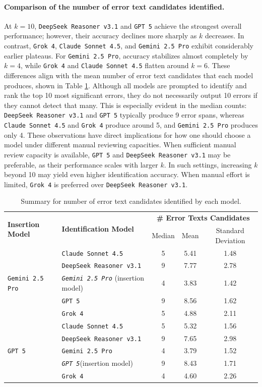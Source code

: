 \documentclass{article}
\newcommand{\gemini}{\texttt{Gemini 2.5 Pro}}
\newcommand{\gpt}{\texttt{GPT 5}}
\newcommand{\grok}{\texttt{Grok 4}}
\newcommand{\deepseek}{\texttt{DeepSeek Reasoner v3.1}}
\newcommand{\claude}{\texttt{Claude Sonnet 4.5}}
\begin{document}
\paragraph{Comparison of the number of error text candidates identified.} At $k=10$, \deepseek{} and \gpt{} achieve the strongest overall performance; however, their accuracy declines more sharply as $k$ decreases. In contrast, \grok{}, \claude{}, and \gemini{} exhibit considerably earlier plateaus. For \gemini{}, accuracy stabilizes almost completely by $k = 4$, while \grok{} and \claude{} flatten around $k = 6$. These differences align with the mean number of error text candidates that each model produces, shown in Table \ref{table:mean_num_identification}. Although all models are prompted to identify and rank the top 10 most significant errors, they do not necessarily output 10 errors if they cannot detect that many. This is especially evident in the median counts: \deepseek{} and \gpt{} typically produce 9 error spans, whereas \claude{} and \grok{} produce around 5, and \gemini{} produces only 4. These observations have direct implications for how one should choose a model under different manual reviewing capacities. When sufficient manual review capacity is available, \gpt{} and \deepseek{} may be preferable, as their performance scales with larger $k$. In such settings, increasing $k$ beyond 10 may yield even higher identification accuracy. When manual effort is limited, \grok{} is preferred over \deepseek{}. 

\begin{table}[!t]
\centering
\begin{tabular}{llccc}
\hline
\multirow{2}{*}{\textbf{Insertion Model}} & \multirow{2}{*}{\textbf{Identification Model}} & \multicolumn{3}{c}{\textbf{\# Error Texts Candidates}} \\
& & Median & Mean & Standard Deviation \\
\hline
\multirow{5}{*}{\gemini{}} & \claude{} & 5 & 5.41 & 1.48\\
& \deepseek{} & 9 & 7.77 & 2.78 \\
& \textit{\gemini{}} (insertion model) & 4 & 3.83 & 1.42\\
& \gpt{} & 9 & 8.56 & 1.62\\
& \grok{} & 5 & 4.88 & 2.11\\
\hline
\multirow{5}{*}{\gpt{}} & \claude{} & 5 & 5.32 & 1.56 \\
& \deepseek{} & 9 & 7.65 & 2.98 \\
& \gemini{} & 4 & 3.79 & 1.52 \\
& \textit{\gpt{}}(insertion model) & 9 & 8.43 & 1.71 \\
& \grok{} & 4 & 4.60 & 2.26\\
\hline
\end{tabular}
\caption{Summary for number of error text candidates identified by each model.}
\label{table:mean_num_identification}
\end{table}
\end{document}
